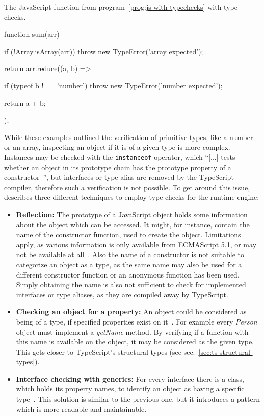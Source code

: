 \begin{program}
\caption{The JavaScript function from program~\ref{prog:js-with-typechecks} with type checks.}
\label{prog:js-with-typechecks}
\begin{JsCode}
function sum(arr) {
  if (!Array.isArray(arr)) {
    throw new TypeError('array expected');
  }
  
  return arr.reduce((a, b) => {
    if (typeof b !== 'number') {
      throw new TypeError('number expected');
    }
    
    return a + b;
  });
}
\end{JsCode}
\end{program}
While these examples outlined the verification of primitive types, like a number or an array, inspecting an object if it is of a given type is more complex. Instances may be checked with the \texttt{instanceof} operator, which ``[...] tests whether an object in its prototype chain has the prototype property of a constructor~\cite{instanceof:MDN:2017}'', but interfaces or type alias are removed by the TypeScript compiler, therefore such a verification is not possible. To get around this issue, \citeauthor{MasteringTypeScript:Rozentals:2015} describes three different techniques to employ type checks for the runtime engine:
\begin{itemize}
  \item \textbf{Reflection:} The prototype of a JavaScript object holds 
some information about the object which can be accessed. It might, for instance, contain the name of the constructor function, used to create the object. Limitations apply, as various
information is only available from ECMAScript 5.1, or may not be available at all~\cite[pp.~98--100]{MasteringTypeScript:Rozentals:2015}. Also the name of a constructor is not suitable to categorize an object as a type, as the same name may also be used for a different constructor function or an anonymous function has been used. Simply obtaining the name is also not sufficient to check for implemented interfaces or type aliases, as they are compiled away by TypeScript.
  \item \textbf{Checking an object for a property:} An object could be considered 
as being of a type, if specified properties exist on it~\cites[pp.~101--102]{MasteringTypeScript:Rozentals:2015}[pp.~18--20]{ProJavaScriptDesignPatterns:HarmesDiaz:2008}. For example every \textit{Person} object must implement a \textit{getName} method. By verifying if a function with this name is available on the object, it may be considered as the given type. This gets closer to TypeScript's structural types (see sec.~\ref{sec:ts-structural-types}).
  \item \textbf{Interface checking with generics:} For every interface there is a 
class, which holds its property names, to identify an object as 
having a specific type~\cites[pp.~102-105]{MasteringTypeScript:Rozentals:2015}[pp.~17--19]{ProJavaScriptDesignPatterns:HarmesDiaz:2008}. This solution is similar to the previous one, but it introduces a pattern which is more readable and maintainable.
\end{itemize}
